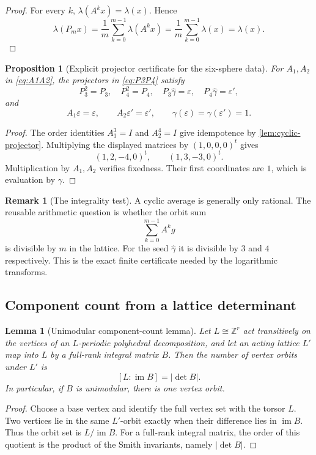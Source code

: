 \documentclass[11pt,reqno]{amsart}
\numberwithin{equation}{section}
\newcommand{\Z}{\mathbb Z}
\newcommand{\im}{\operatorname{im}}
\newcommand{\eps}{\varepsilon}
\newcommand{\epsp}{\varepsilon'}
\newcommand{\wideg}{\widehat\gamma}
\newtheorem{proposition}[theorem]{Proposition}
\newtheorem{lemma}[theorem]{Lemma}
\theoremstyle{definition}
\newtheorem{remark}[theorem]{Remark}
\begin{document}
\begin{proof}
For every $k$, $\lambda(A^kx)=\lambda(x)$. Hence
\[
\lambda(P_mx)=\frac1m\sum_{k=0}^{m-1}\lambda(A^kx)
=\frac1m\sum_{k=0}^{m-1}\lambda(x)=\lambda(x).
\]
\end{proof}

\begin{proposition}[Explicit projector certificate for the six-sphere data]\label{prop:projector-certificate}
For $A_1,A_2$ in \cref{eq:A1A2}, the projectors in \cref{eq:P3P4} satisfy
\[
P_3^2=P_3,
\quad
P_4^2=P_4,
\quad
P_3\wideg=\eps,
\quad
P_4\wideg=\epsp,
\]
and
\[
A_1\eps=\eps,
\qquad
A_2\epsp=\epsp,
\qquad
\gamma(\eps)=\gamma(\epsp)=1.
\]
\end{proposition}

\begin{proof}
The order identities $A_1^3=I$ and $A_2^4=I$ give idempotence by \cref{lem:cyclic-projector}. Multiplying the displayed matrices by $(1,0,0,0)^t$ gives
\[
(1,2,-4,0)^t,
\qquad
(1,3,-3,0)^t.
\]
Multiplication by $A_1,A_2$ verifies fixedness. Their first coordinates are $1$, which is evaluation by $\gamma$.
\end{proof}

\begin{remark}[The integrality test]
A cyclic average is generally only rational. The reusable arithmetic question is whether the orbit sum
\[
\sum_{k=0}^{m-1}A^kg
\]
is divisible by $m$ in the lattice. For the seed $\wideg$ it is divisible by $3$ and $4$ respectively. This is the exact finite certificate needed by the logarithmic transforms.
\end{remark}

\subsection{Component count from a lattice determinant}

\begin{lemma}[Unimodular component-count lemma]\label{lem:component-index}
Let $L\cong\Z^r$ act transitively on the vertices of an $L$-periodic polyhedral decomposition, and let an acting lattice $L'$ map into $L$ by a full-rank integral matrix $B$. Then the number of vertex orbits under $L'$ is
\[
[L:\im B]=|\det B|.
\]
In particular, if $B$ is unimodular, there is one vertex orbit.
\end{lemma}

\begin{proof}
Choose a base vertex and identify the full vertex set with the torsor $L$. Two vertices lie in the same $L'$-orbit exactly when their difference lies in $\im B$. Thus the orbit set is $L/\im B$. For a full-rank integral matrix, the order of this quotient is the product of the Smith invariants, namely $|\det B|$.
\end{proof}
\end{document}
